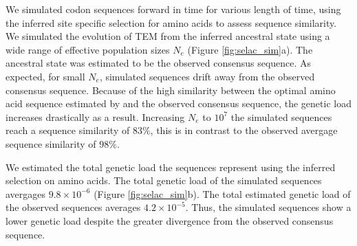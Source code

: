 \documentclass[12pt]{article}
\begin{document}
We simulated codon sequences forward in time for various length of time, using the \selac inferred site specific selection for amino acids to assess sequence similarity.
We simulated the evolution of TEM from the inferred ancestral state using a wide range of effective population sizes $N_e$ (Figure \ref{fig:selac_sim}a).
The ancestral state was estimated to be the observed consensus sequence.
As expected, for small $N_e$, simulated sequences drift away from the observed consensus sequence. 
Because of the high similarity between the optimal amino acid sequence estimated by \selac and the observed consensus sequence, the genetic load increases drastically as a result.
Increasing $N_e$ to $10^7$ the simulated sequences reach a sequence similarity of $83 \%$, this is in contrast to the observed avergage sequence similarity of $98 \%$.

We estimated the total genetic load the sequences represent using the \selac inferred selection on amino acids.
The total genetic load of the simulated sequences avergages $9.8\times10^{-6}$ (Figure \ref{fig:selac_sim}b).
The total estimated genetic load of the observed sequences averages $4.2\times 10^{-5}$.
Thus, the simulated sequences show a lower genetic load despite the greater divergence from the observed consensus sequence.
\end{document}
